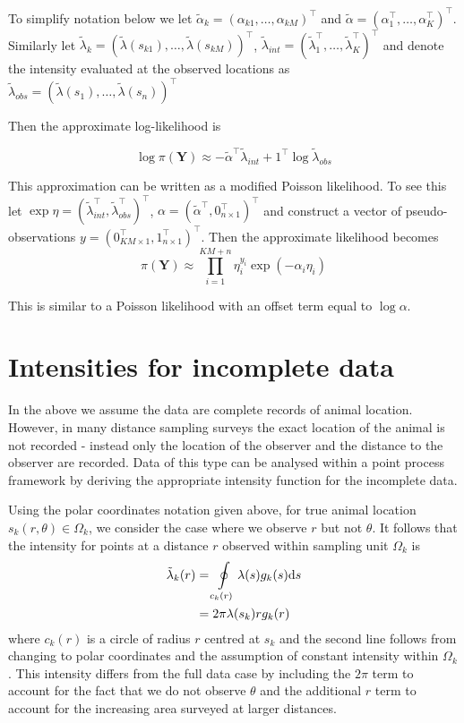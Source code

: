 \documentclass[preprint,12pt]{elsarticle}
\newcommand{\bm}{\boldsymbol}  %
\newcommand{\tl}{\tilde{\lambda}}   %
\begin{document}
To simplify notation below we let $\tilde{\alpha}_{k} = (\alpha_{k1}, \ldots, \alpha_{kM})^\intercal$ and $\tilde{\alpha} = (\alpha_1^\intercal, \ldots, \alpha_K^\intercal)^\intercal$.  Similarly let $\tl_k = (\tl(s_{k1}), \ldots, \tl(s_{kM}))^\intercal$, $\tl_{int} = (\tl_1^\intercal, \ldots, \tl_K^\intercal)^\intercal$ and denote the intensity evaluated at the observed locations as $\tl_{obs} = (\tl(s_1), \ldots, \tl(s_n))^\intercal$

Then the approximate log-likelihood is

\begin{equation}
\label{approx-log-likelihood}
	\log \pi(\bm{Y}) \approx - \tilde{\alpha}^\intercal \tl_{int} + 1^\intercal\log\tl_{obs}
\end{equation}

This approximation can be written as a modified Poisson likelihood.  To see this let $\exp \eta = (\tl_{int}^\intercal, \tl_{obs}^\intercal)^\intercal$,
$\alpha = (\tilde{\alpha}^\intercal, 0_{n \times 1}^\intercal)^\intercal$ and construct a vector of pseudo-observations $y = (0_{KM\times 1}^\intercal, 1_{n \times 1}^\intercal)^\intercal$.  Then the approximate likelihood becomes
\begin{equation}
\pi(\bm{Y}) \approx \prod_{i=1}^{KM + n} \eta_i^{y_i}\exp(-\alpha_i\eta_i)
\end{equation}

This is similar to a Poisson likelihood with an offset term equal to $\log\alpha$.


\section*{Intensities for incomplete data}

In the above we assume the data are complete records of animal location.  However, in many distance sampling surveys the exact location of the animal is not recorded - instead only the location of the observer and the distance to the observer are recorded.  Data of this type can be analysed within a point process framework by deriving the appropriate intensity function for the incomplete data.

Using the polar coordinates notation given above, for true animal location $s_k(r, \theta) \in \Omega_k$, we consider the case where we observe $r$ but not $\theta$.  It follows that the intensity for points at a distance $r$ observed within sampling unit $\Omega_k$ is
\begin{align}
\tl_k(r) &= \oint\displaylimits_{c_k(r)} \lambda(s)g_k(s)\mathrm{d}s \nonumber \\
&= 2\pi\lambda(s_k)rg_k(r)
\end{align}
 where $c_k(r)$ is a circle of radius $r$ centred at $s_k$ and the second line follows from changing to polar coordinates and the assumption of constant intensity within $\Omega_k$.  This intensity differs from the full data case by including the $2\pi$  term to account for the fact that we do not observe $\theta$ and the additional $r$ term to account for the increasing area surveyed at larger distances.
\end{document}
